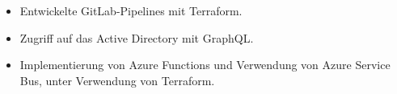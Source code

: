 \begin{itemize}
    \item Entwickelte GitLab-Pipelines mit Terraform.
    \item Zugriff auf das Active Directory mit GraphQL.
    \item Implementierung von Azure Functions und Verwendung von Azure Service Bus, unter Verwendung von Terraform.
\end{itemize}
